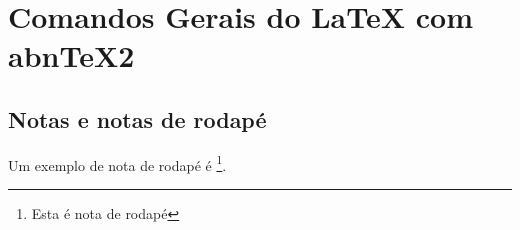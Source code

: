 \chapter{Comandos Gerais do LaTeX com abnTeX2}

\section{Notas e notas de rodapé}

Um exemplo de nota de rodapé é \footnote{Esta é nota de rodapé}.